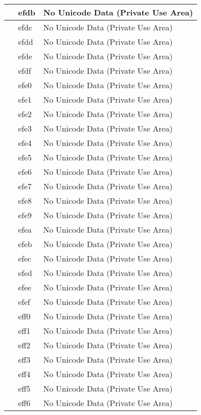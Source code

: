 \documentclass[12pt,letterpaper,openany]{book}
\begin{document}
\begin{center}
\begin{supertabular}{|m{0.25in}|m{0.5in}|m{4in}|}
 & efdb & No Unicode Data (Private Use Area)\\\hline
 & efdc & No Unicode Data (Private Use Area)\\\hline
 & efdd & No Unicode Data (Private Use Area)\\\hline
 & efde & No Unicode Data (Private Use Area)\\\hline
 & efdf & No Unicode Data (Private Use Area)\\\hline
 & efe0 & No Unicode Data (Private Use Area)\\\hline
 & efe1 & No Unicode Data (Private Use Area)\\\hline
 & efe2 & No Unicode Data (Private Use Area)\\\hline
 & efe3 & No Unicode Data (Private Use Area)\\\hline
 & efe4 & No Unicode Data (Private Use Area)\\\hline
 & efe5 & No Unicode Data (Private Use Area)\\\hline
 & efe6 & No Unicode Data (Private Use Area)\\\hline
 & efe7 & No Unicode Data (Private Use Area)\\\hline
 & efe8 & No Unicode Data (Private Use Area)\\\hline
 & efe9 & No Unicode Data (Private Use Area)\\\hline
 & efea & No Unicode Data (Private Use Area)\\\hline
 & efeb & No Unicode Data (Private Use Area)\\\hline
 & efec & No Unicode Data (Private Use Area)\\\hline
 & efed & No Unicode Data (Private Use Area)\\\hline
 & efee & No Unicode Data (Private Use Area)\\\hline
 & efef & No Unicode Data (Private Use Area)\\\hline
 & eff0 & No Unicode Data (Private Use Area)\\\hline
 & eff1 & No Unicode Data (Private Use Area)\\\hline
 & eff2 & No Unicode Data (Private Use Area)\\\hline
 & eff3 & No Unicode Data (Private Use Area)\\\hline
 & eff4 & No Unicode Data (Private Use Area)\\\hline
 & eff5 & No Unicode Data (Private Use Area)\\\hline
 & eff6 & No Unicode Data (Private Use Area)\\\hline

\end{supertabular}
\end{center}
\end{document}
